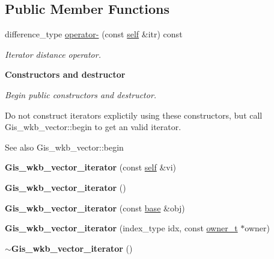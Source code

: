 \subsection*{Public Member Functions}
\begin{DoxyCompactItemize}
\item 
difference\+\_\+type \mbox{\hyperlink{classGis__wkb__vector__iterator_adc4bec71976681c3c3fb39da7a7068fa}{operator-\/}} (const \mbox{\hyperlink{classGis__wkb__vector__const__iterator}{self}} \&itr) const
\begin{DoxyCompactList}\small\item\em Iterator distance operator. \end{DoxyCompactList}\end{DoxyCompactItemize}
\begin{Indent}\textbf{ Constructors and destructor}\par
{\em Begin public constructors and destructor.

Do not construct iterators explictily using these constructors, but call Gis\+\_\+wkb\+\_\+vector\+::begin to get an valid iterator. \begin{DoxySeeAlso}{See also}
Gis\+\_\+wkb\+\_\+vector\+::begin 
\end{DoxySeeAlso}
}\begin{DoxyCompactItemize}
\item 
\mbox{\label{classGis__wkb__vector__iterator_a29bf9aa4588fb09523f42e5e9bda2e89}} 
{\bfseries Gis\+\_\+wkb\+\_\+vector\+\_\+iterator} (const \mbox{\hyperlink{classGis__wkb__vector__const__iterator}{self}} \&vi)
\item 
\mbox{\label{classGis__wkb__vector__iterator_a9f1c4cd6bb43ad43f177de27416ef8a5}} 
{\bfseries Gis\+\_\+wkb\+\_\+vector\+\_\+iterator} ()
\item 
\mbox{\label{classGis__wkb__vector__iterator_a054dfdefa4e5aeba3ea4eddb64831dc1}} 
{\bfseries Gis\+\_\+wkb\+\_\+vector\+\_\+iterator} (const \mbox{\hyperlink{classGis__wkb__vector__const__iterator}{base}} \&obj)
\item 
\mbox{\label{classGis__wkb__vector__iterator_a0ac2bd387b901c967b45277678cd1bce}} 
{\bfseries Gis\+\_\+wkb\+\_\+vector\+\_\+iterator} (index\+\_\+type idx, const \mbox{\hyperlink{classGis__wkb__vector}{owner\+\_\+t}} $\ast$owner)
\item 
\mbox{\label{classGis__wkb__vector__iterator_a9d18b44f90504f72ad98c2dfdcca3f2d}} 
{\bfseries $\sim$\+Gis\+\_\+wkb\+\_\+vector\+\_\+iterator} ()
\end{DoxyCompactItemize}
\end{Indent}
